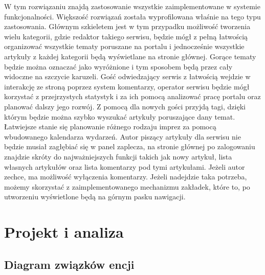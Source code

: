 \documentclass[openright]{xmgr}
\begin{document}
W tym rozwiązaniu znajdą zastosowanie wszystkie zaimplementowane w systemie funkcjonalności. Większość rozwiązań została wyprofilowana właśnie na tego typu zastosowania. Głównym szkieletem jest w tym przypadku możliwość tworzenia wielu kategorii, gdzie redaktor takiego serwisu, będzie mógł z pełną łatwością organizować wszystkie tematy poruszane na portalu i jednocześnie wszystkie artykuły z każdej kategorii będą wyświetlane na stronie głównej. Gorące tematy będzie można oznaczać jako wyróżnione i tym sposobem będą przez cały widoczne na szczycie karuzeli. Gość odwiedzający serwis z łatwością wejdzie w interakcję ze stroną poprzez system komentarzy, operator serwisu będzie mógł korzystać z przejrzystych statystyk i za ich pomocą analizować pracę portalu oraz planować dalszy jego rozwój. Z pomocą dla nowych gości przyjdą tagi, dzięki którym będzie można szybko wyszukać artykuły poruszające dany temat. Łatwiejsze stanie się planowanie różnego rodzaju imprez za pomocą wbudowanego kalendarza wydarzeń. Autor piszący artykuły dla serwisu nie będzie musiał zagłębiać się w panel zaplecza, na stronie głównej po zalogowaniu znajdzie skróty do najważniejszych funkcji takich jak nowy artykuł, lista własnych artykułów oraz lista komentarzy pod tymi artykułami. Jeżeli autor zechce,  ma możliwość wyłączenia komentarzy. Jeżeli nadejdzie taka potrzeba, możemy skorzystać z zaimplementowanego mechanizmu zakładek, które to, po utworzeniu wyświetlone będą na górnym pasku nawigacji.

\chapter{Projekt i analiza}

\newpage

\section{Diagram związków encji}
\end{document}
